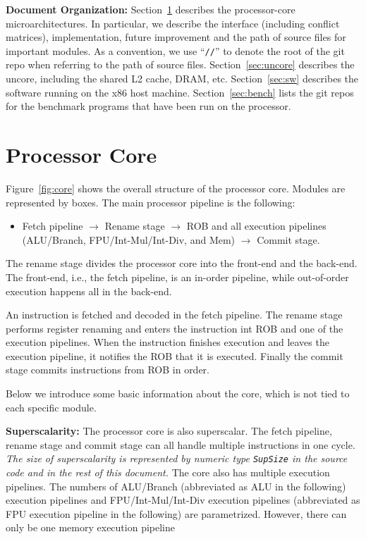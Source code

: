 \documentclass[12pt]{article}
\newcommand{\code}[1]{\texttt{#1}}
\begin{document}
\noindent\textbf{Document Organization:}
Section~\ref{sec:core} describes the processor-core microarchitectures.
In particular, we describe the interface (including conflict matrices), implementation, future improvement and the path of source files for important modules.
As a convention, we use ``\code{//}'' to denote the root of the git repo when referring to the path of source files.
Section~\ref{sec:uncore} describes the uncore, including the shared L2 cache, DRAM, etc.
Section~\ref{sec:sw} describes the software running on the x86 host machine.
Section~\ref{sec:bench} lists the git repos for the benchmark programs that have been run on the processor.

\section{Processor Core}\label{sec:core}

Figure~\ref{fig:core} shows the overall structure of the processor core.
Modules are represented by boxes.
The main processor pipeline is the following:
\begin{itemize}
    \item Fetch pipeline $\rightarrow$ Rename stage $\rightarrow$ ROB and all execution pipelines (ALU/Branch, FPU/Int-Mul/Int-Div, and Mem) $\rightarrow$ Commit stage.
\end{itemize}
The rename stage divides the processor core into the front-end and the back-end.
The front-end, i.e., the fetch pipeline, is an in-order pipeline, while out-of-order execution happens all in the back-end.

An instruction is fetched and decoded in the fetch pipeline.
The rename stage performs register renaming and enters the instruction int ROB and one of the execution pipelines.
When the instruction finishes execution and leaves the execution pipeline, it notifies the ROB that it is executed.
Finally the commit stage commits instructions from ROB in order.

Below we introduce some basic information about the core, which is not tied to each specific module.

\noindent\textbf{Superscalarity:}
The processor core is also superscalar.
The fetch pipeline, rename stage and commit stage can all handle multiple instructions in one cycle.
\emph{The size of superscalarity is represented by numeric type \code{SupSize} in the source code and in the rest of this document.}
The core also has multiple execution pipelines.
The numbers of ALU/Branch (abbreviated as ALU in the following) execution pipelines and FPU/Int-Mul/Int-Div execution pipelines (abbreviated as FPU execution pipeline in the following) are parametrized.
However, there can only be one memory execution pipeline
\end{document}

